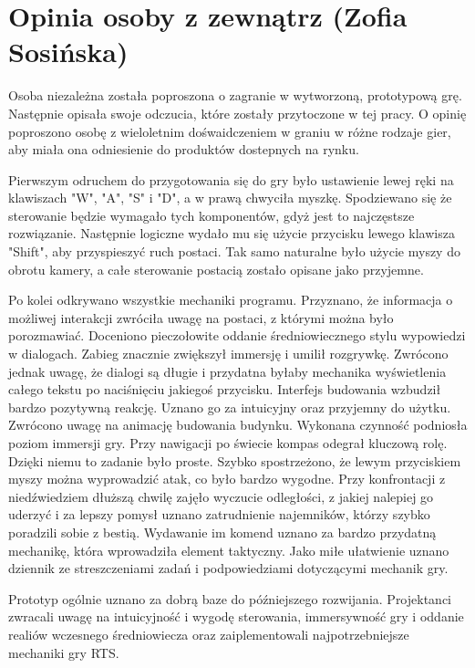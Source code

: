 \section{Opinia osoby z zewnątrz (Zofia Sosińska)}
Osoba niezależna została poproszona o zagranie w wytworzoną, prototypową grę. Następnie opisała swoje odczucia, które zostały przytoczone 
w tej pracy. O opinię poproszono osobę z wieloletnim dośwaidczeniem w graniu w różne rodzaje gier, aby miała ona odniesienie do produktów
dostepnych na rynku.

Pierwszym odruchem do przygotowania się do gry było ustawienie lewej ręki na klawiszach "W", "A", "S" i "D", a w prawą chwyciła myszkę. Spodziewano się 
że sterowanie będzie wymagało tych komponentów, gdyż jest to najczęstsze rozwiązanie. Następnie logiczne wydało mu się użycie przycisku lewego klawisza "Shift", aby przyspieszyć ruch postaci. 
Tak samo naturalne było użycie myszy do obrotu kamery, a całe sterowanie postacią zostało opisane jako przyjemne.

Po kolei odkrywano wszystkie mechaniki programu. Przyznano, że informacja o możliwej interakcji zwróciła uwagę na postaci, z którymi można było porozmawiać. 
Doceniono pieczołowite oddanie średniowiecznego stylu wypowiedzi w dialogach. Zabieg znacznie zwiększył immersję i umilił rozgrywkę. Zwrócono jednak uwagę,
że dialogi są długie i przydatna byłaby mechanika wyświetlenia całego tekstu po naciśnięciu jakiegoś przycisku. Interfejs budowania wzbudził bardzo pozytywną reakcję.
Uznano go za intuicyjny oraz przyjemny do użytku. Zwrócono uwagę na animację budowania budynku. Wykonana czynność podniosła poziom immersji gry. Przy nawigacji po świecie
kompas odegrał kluczową rolę. Dzięki niemu to zadanie było proste. Szybko spostrzeżono, że lewym przyciskiem myszy można wyprowadzić atak, co było bardzo wygodne. 
Przy konfrontacji z niedźwiedziem dłuższą chwilę zajęło wyczucie odległości, z jakiej nalepiej go uderzyć i za lepszy pomysł uznano zatrudnienie najemników, którzy szybko poradzili
sobie z bestią. Wydawanie im komend uznano za bardzo przydatną mechanikę, która wprowadziła element taktyczny. Jako miłe ułatwienie uznano dziennik ze streszczeniami zadań i 
podpowiedziami dotyczącymi mechanik gry.

Prototyp ogólnie uznano za dobrą baze do późniejszego rozwijania. Projektanci zwracali uwagę na intuicyjność i wygodę sterowania, immersywność gry i oddanie realiów wczesnego średniowiecza
oraz zaiplementowali najpotrzebniejsze mechaniki gry RTS. 